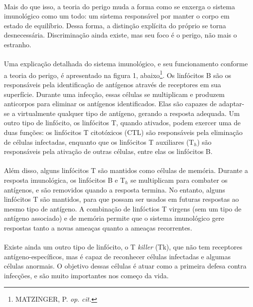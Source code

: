 \documentclass{iiufrgs}
\begin{document}
\paragraph{}Mais do que isso, a teoria do perigo muda a forma como se enxerga o sistema imunológico como um todo: um sistema responsável por manter o corpo em estado de equilíbrio. Dessa forma, a distinção explícita do próprio se torna desnecessária. Discriminação ainda existe, mas seu foco é o perigo, não mais o estranho.

\paragraph{}Uma explicação detalhada do sistema imunológico, e seu funcionamento conforme a teoria do perigo, é apresentado na figura 1, abaixo\footnote{MATZINGER, P. \emph{op. cit.}}. Os linfócitos B são os responsáveis pela identificação de antígenos através de receptores em sua superfície. Durante uma infecção, essas células se multiplicam e produzem anticorpos para eliminar os antígenos identificados. Elas são capazes de adaptar-se a virtualmente qualquer tipo de antígeno, gerando a resposta adequada. Um outro tipo de linfócito, os linfócitos T, quando ativados, podem exercer uma de duas funções: os linfócitos T citotóxicos (CTL) são responsáveis pela eliminação de células infectadas, enquanto que os linfócitos T auxiliares (T$_{h}$) são responsáveis pela ativação de outras células, entre elas os linfócitos B.

\paragraph{}Além disso, alguns linfócitos T são mantidos como células de memória. Durante a resposta imunológica, os linfócitos B e T$_{h}$ se multiplicam para combater os antígenos, e são removidos quando a resposta termina. No entanto, alguns linfócitos T são mantidos, para que possam ser usados em futuras respostas ao mesmo tipo de antígeno. A combinação de linfóctios T virgens (sem um tipo de antígeno associado) e de memória permite que o sistema imunológico gere respostas tanto a novas ameaças quanto a ameaças recorrentes.

\paragraph{}Existe ainda um outro tipo de linfócito, o T \emph{killer} (Tk), que não tem receptores antígeno-específicos, mas é capaz de reconhecer células infectadas e algumas células anormais. O objetivo dessas células é atuar como a primeira defesa contra infecções, e são muito importantes nos começo da vida.
\end{document}
